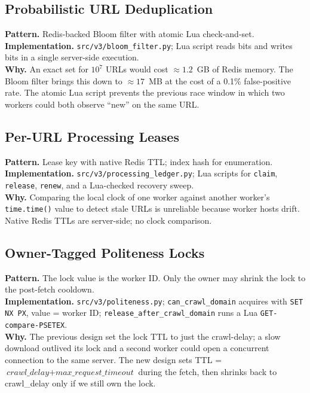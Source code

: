 \documentclass[11pt,a4paper]{article}
\newcommand{\code}[1]{\texttt{#1}}
\begin{document}
\subsection{Probabilistic URL Deduplication}

\textbf{Pattern.} Redis-backed Bloom filter with atomic Lua check-and-set.\\
\textbf{Implementation.} \code{src/v3/bloom\_filter.py}; Lua script reads bits and writes bits in a single server-side execution.\\
\textbf{Why.} An exact set for $10^7$ URLs would cost $\approx 1.2$~GB of Redis memory. The Bloom filter brings this down to $\approx 17$~MB at the cost of a 0.1\% false-positive rate. The atomic Lua script prevents the previous race window in which two workers could both observe ``new'' on the same URL.

\subsection{Per-URL Processing Leases}

\textbf{Pattern.} Lease key with native Redis TTL; index hash for enumeration.\\
\textbf{Implementation.} \code{src/v3/processing\_ledger.py}; Lua scripts for \code{claim}, \code{release}, \code{renew}, and a Lua-checked recovery sweep.\\
\textbf{Why.} Comparing the local clock of one worker against another worker's \code{time.time()} value to detect stale URLs is unreliable because worker hosts drift. Native Redis TTLs are server-side; no clock comparison.

\subsection{Owner-Tagged Politeness Locks}

\textbf{Pattern.} The lock value is the worker ID. Only the owner may shrink the lock to the post-fetch cooldown.\\
\textbf{Implementation.} \code{src/v3/politeness.py}; \code{can\_crawl\_domain} acquires with \code{SET NX PX}, value = worker ID; \code{release\_after\_crawl\_domain} runs a Lua \code{GET-compare-PSETEX}.\\
\textbf{Why.} The previous design set the lock TTL to just the crawl-delay; a slow download outlived its lock and a second worker could open a concurrent connection to the same server. The new design sets TTL = $\textit{crawl\_delay} + \textit{max\_request\_timeout}$ during the fetch, then shrinks back to crawl\_delay only if we still own the lock.
\end{document}
